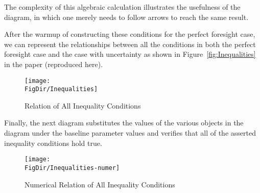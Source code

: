 \documentclass[\econtexRoot/BufferStockTheory]{subfiles}
\begin{document}
The complexity of this algebraic calculation illustrates the usefulness of the diagram, in which one merely needs to follow arrows to reach the same result.

After the warmup of constructing these conditions for the perfect foresight case, we can represent the relationships between all the conditions in both the perfect foresight case and the case with uncertainty as shown in Figure~\ref{fig:Inequalities} in the paper (reproduced here).

\begin{figure}[ht]
  \centerline{
    \texttt{[image: \\FigDir/Inequalities]}
  }
  \caption{Relation of All Inequality Conditions}\label{fig:InequalitiesApp}
\end{figure}

Finally, the next diagram substitutes the values of the various objects in the diagram under the baseline parameter values and verifies that all of the asserted inequality conditions hold true.
\begin{figure}[ht]
  \centerline{
    \texttt{[image: \\FigDir/Inequalities-numer]}
  }
  \caption{Numerical Relation of All Inequality Conditions}\label{fig:InequalitiesAppNumer}
\end{figure}

\onlyinsubfile{\pagebreak}
\end{document}
